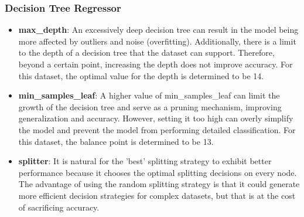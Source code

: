 \documentclass[a4paper]{article}
\begin{document}
\subsubsection{Decision Tree Regressor}

\begin{itemize}
    \item \textbf{max\_depth}: An excessively deep decision tree can result in the model being more affected by outliers and noise (overfitting). Additionally, there is a limit to the depth of a decision tree that the dataset can support. Therefore, beyond a certain point, increasing the depth does not improve accuracy. For this dataset, the optimal value for the depth is determined to be 14.
    \item \textbf{min\_samples\_leaf}: A higher value of min\_samples\_leaf can limit the growth of the decision tree and serve as a pruning mechanism, improving generalization and accuracy. However, setting it too high can overly simplify the model and prevent the model from performing detailed classification. For this dataset, the balance point is determined to be 13.
    \item \textbf{splitter}: It is natural for the 'best' splitting strategy to exhibit better performance because it chooses the optimal splitting decisions on every node. The advantage of using the random splitting strategy is that it could generate more efficient decision strategies for complex datasets, but that is at the cost of sacrificing accuracy.
\end{itemize}
\end{document}
